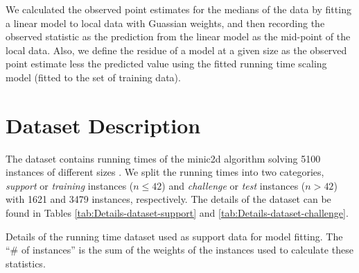 We calculated the observed point estimates for the medians of the
data by fitting a linear model to local data with Guassian weights, and
then recording the observed statistic as the prediction from the linear
model as the mid-point of the local data.
Also, we define the residue of a model at a given size as the observed
point estimate less the
predicted value using the fitted running time scaling model (fitted to
the set of training data).


\section{Dataset Description}

The dataset contains running times of the minic2d algorithm solving
5100 instances of different sizes . We split the
running times into two categories, \emph{support} or \emph{training}
instances ($n\leq42$) and \emph{challenge} or
\emph{test} instances ($n>42$) with 1621
and 3479 instances, respectively. The
details of the dataset can be found in Tables \ref{tab:Details-dataset-support}
and \ref{tab:Details-dataset-challenge}.
\begin{table*}
\noindent \begin{centering}

\par\end{centering}

\caption{\label{tab:Details-dataset-support} Details of the running time
dataset used as support data for model fitting.
 The ``\# of instances'' is the
sum of the weights of the instances used to calculate these statistics.}
\end{table*}

